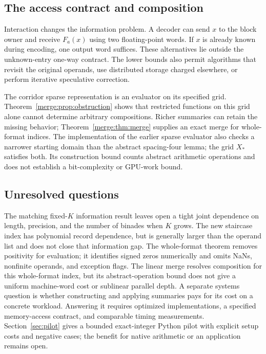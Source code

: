 \documentclass[11pt,reqno]{amsart}
\theoremstyle{definition}
\theoremstyle{remark}
\numberwithin{equation}{section}
\begin{document}
\subsection{The access contract and composition}

Interaction changes the information problem. A decoder can send $x$ to the
block owner and receive $F_a(x)$ using two floating-point words. If $x$ is
already known during encoding, one output word suffices. These alternatives
lie outside the unknown-entry one-way contract. The lower bounds also permit
algorithms that revisit the original operands, use distributed storage charged
elsewhere, or perform iterative speculative correction.

The corridor sparse representation is an evaluator on its specified grid.
Theorem~\ref{merge:prop:obstruction} shows that restricted functions on this
grid alone cannot determine arbitrary compositions. Richer summaries can
retain the missing behavior; Theorem~\ref{merge:thm:merge} supplies an exact
merge for whole-format indices. The implementation of the earlier sparse evaluator also
checks a narrower starting domain than the abstract spacing-four lemma; the
grid $X_\ast$ satisfies both. Its construction bound counts abstract arithmetic
operations and does not establish a bit-complexity or GPU-work bound.

\subsection{Unresolved questions}

The matching fixed-$K$ information result leaves open a tight joint
dependence on length, precision, and the number of binades when $K$ grows.
The new staircase index has polynomial record dependence, but is generally
larger than the operand list and does not close that information gap.
The whole-format theorem removes positivity for evaluation; it identifies
signed zeros numerically and omits NaNs, nonfinite operands, and exception
flags. The linear merge resolves composition for this whole-format index,
but its abstract-operation bound does not give a uniform machine-word cost
or sublinear parallel depth. A separate systems question is whether constructing
and applying summaries pays for its cost on a concrete workload. Answering it
requires optimized implementations, a specified memory-access contract, and
comparable timing measurements. Section~\ref{sec:pilot} gives a bounded
exact-integer Python pilot with explicit setup costs and negative cases;
the benefit for native arithmetic or an application remains open.
\end{document}
